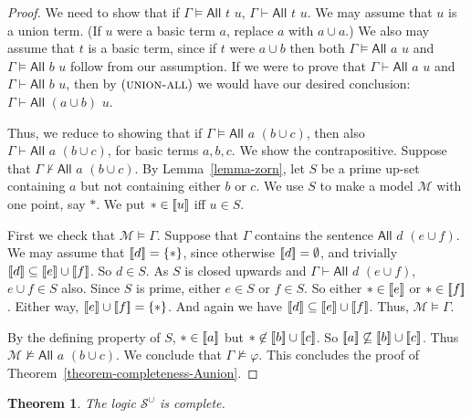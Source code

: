 \documentclass[letterpaper]{article} %
\newtheorem{theorem}{Theorem}[section]
\theoremstyle{definition}
\newcommand{\semantics}[1]{[\![\mbox{\em $ #1 $\/}]\!]}
\newcommand{\Model}{\mathcal{M}}
\newcommand{\set}[1]{\{ #1 \}}
\newcommand{\proves}{\vdash}
\newcommand{\Sunion}{\mathscr{S}^{\cup}}
\newcommand{\proverule}{\textsc}
\newcommand{\All}[2]{\mathsf{All}\,\,#1\,\,#2}
\begin{document}
\begin{proof}
We need to show that if $\Gamma\models \All{t}{u}$,
$\Gamma\proves \All{t}{u}$.
We may assume that $u$ is a union term.  (If $u$ were a basic term $a$, replace $a$ with $a\cup a$.)
We also may assume that $t$ is a basic term, since if $t$ were $a \cup b$ then both $\Gamma\models \All{a}{u}$
and $\Gamma\models \All{b}{u}$ follow from our assumption.   If we were to prove that $\Gamma \vdash \All{a}{u}$ and $\Gamma \vdash \All{b}{u}$, then by $(\proverule{union-all})$
we would have our desired conclusion:
$\Gamma \vdash \All{(a \cup b)}{u}$.

Thus, we reduce to showing that if  $\Gamma\models \All{a}{(b \cup c)}$, then also  $\Gamma \proves \All{a}{(b \cup c)}$, for basic terms $a, b, c$.
We show the contrapositive.   Suppose
 that $\Gamma\not\proves \All{a}{(b \cup c)}$.
By Lemma~\ref{lemma-zorn}, let $S$ be a prime up-set containing $a$ but not containing either $b$ or $c$.
We use $S$ to make a model $\Model$ with one point, say $*$.   We put $*\in \semantics{u}$ iff $u\in S$.

First we check that $\Model\models \Gamma$.  
Suppose that $\Gamma$ contains the sentence $\All{d}{(e \cup f)}$. We may assume that $\semantics{d} = \set{*}$, 
since otherwise $\semantics{d} = \emptyset$, and trivially $\semantics{d}\subseteq \semantics{e}\cup\semantics{f}$.
So $d \in S$.  As $S$ is closed upwards and $\Gamma \proves \All{d}{(e \cup f)}$, $e \cup f\in S$ also.   Since $S$ is prime, either $e\in S$ or $f\in S$.
So either $*\in\semantics{e}$ or $*\in \semantics{f}$.  Either way, $\semantics{e} \cup \semantics{f} = \set{*}$.  And again we have 
$\semantics{d}\subseteq \semantics{e}\cup\semantics{f}$.
Thus, $\Model\models \Gamma$.  

By the defining property of $S$, $*\in \semantics{a}$ but $*\not\in \semantics{b}\cup\semantics{c}$.   So 
$ \semantics{a} \not\subseteq \semantics{b}\cup\semantics{c}$.  Thus $\Model \not\models \All{a}{(b \cup c)}$.  We conclude that $\Gamma \not\models \varphi$.
This concludes the proof of Theorem~\ref{theorem-completeness-Aunion}.
\end{proof}


\begin{theorem}
    The logic $\Sunion$ is complete.
    \label{theorem-completeness-Sunion}
\end{theorem}
 
\end{document}
